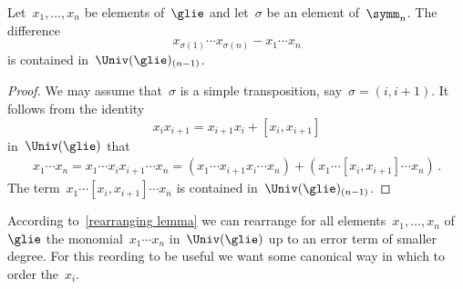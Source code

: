 \begin{lemma}
	\label{rearranging lemma}
	Let~$x_1, \dotsc, x_n$ be elements of~$\glie$ and let~$\sigma$ be an element of~$\symm_n$. 
	The difference
	\[
		x_{\sigma(1)} \dotsm x_{\sigma(n)}
		-
		x_1 \dotsm x_n
	\]
	is contained in~$\Univ(\glie)_{(n-1)}$.
\end{lemma}


\begin{proof}
	We may assume that~$\sigma$ is a simple transposition, say~$\sigma = (i, i+1)$.
	It follows from the identity
	\[
		x_i x_{i+1}
		=
		x_{i+1} x_i + [x_i, x_{i+1}]
	\]
	in~$\Univ(\glie)$ that
	\begin{align*}
		x_1 \dotsm x_n
		=
		x_1 \dotsm x_i x_{i+1} \dotsm x_n
		=
		(x_1 \dotsm x_{i+1} x_i \dotsm x_n)
		+
		(x_1 \dotsm [x_i, x_{i+1}] \dotsm x_n) \,.
	\end{align*}
	The term~$x_1 \dotsm [x_i, x_{i+1}] \dotsm x_n$ is contained in~$\Univ(\glie)_{(n-1)}$.
\end{proof}


\begin{fluff}
	According to~\cref{rearranging lemma} we can rearrange for all elements~$x_1, \dotsc, x_n$ of~$\glie$ the monomial~$x_1 \dotsm x_n$ in~$\Univ(\glie)$ up to an error term of smaller degree.
	For this reording to be useful we want some canonical way in which to order the~$x_i$.
\end{fluff}


